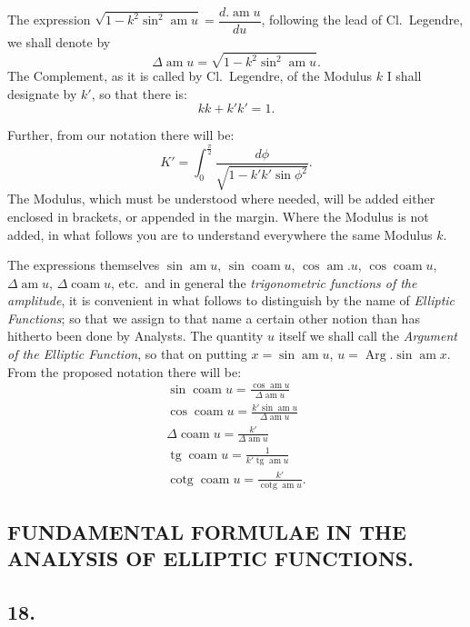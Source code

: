 \documentclass{article}
\begin{document}
The expression $\sqrt{1-k^{2}\sin^{2}\operatorname{am}u}=\dfrac{d.\operatorname{am}u}{du}$, following the lead of Cl.\ Legendre, we shall denote by
\[
\Delta\operatorname{am}u=\sqrt{1-k^{2}\sin^{2}\operatorname{am}u}.
\]
The Complement, as it is called by Cl.\ Legendre, of the Modulus $k$ I shall designate by $k'$, so that there is:
\[
kk+k'k'=1.
\]

Further, from our notation there will be:
\[
K'=\int_{0}^{\frac{\pi}{2}}\frac{d\phi}{\sqrt{1-k'k'\sin\phi^{2}}}.
\]
The Modulus, which must be understood where needed, will be added either enclosed in brackets, or appended in the margin. Where the Modulus is not added, in what follows you are to understand everywhere the same Modulus $k$.

The expressions themselves $\sin\operatorname{am}u$, $\sin\operatorname{coam}u$, $\cos\operatorname{am}.u$, $\cos\operatorname{coam}u$, $\Delta\operatorname{am}u$, $\Delta\operatorname{coam}u$, etc.\ and in general the \emph{trigonometric functions of the amplitude}, it is convenient in what follows to distinguish by the name of \emph{Elliptic Functions}; so that we assign to that name a certain other notion than has hitherto been done by Analysts. The quantity $u$ itself we shall call the \emph{Argument of the Elliptic Function}, so that on putting $x=\sin\operatorname{am}u$, $u=\operatorname{Arg}.\sin\operatorname{am}x$. From the proposed notation there will be:
\[
\begin{gathered}
\sin\operatorname{coam}u=\frac{\cos\operatorname{am}u}{\Delta\operatorname{am}u}\\
\cos\operatorname{coam}u=\frac{k'\sin\operatorname{am}u}{\Delta\operatorname{am}u}\\
\Delta\operatorname{coam}u=\frac{k'}{\Delta\operatorname{am}u}\\
\operatorname{tg}\operatorname{coam}u=\frac{1}{k'\operatorname{tg}\operatorname{am}u}\\
\operatorname{cotg}\operatorname{coam}u=\frac{k'}{\operatorname{cotg}\operatorname{am}u}.
\end{gathered}
\]


\subsection*{FUNDAMENTAL FORMULAE IN THE ANALYSIS OF ELLIPTIC FUNCTIONS.}

\subsection*{18.}
\end{document}
